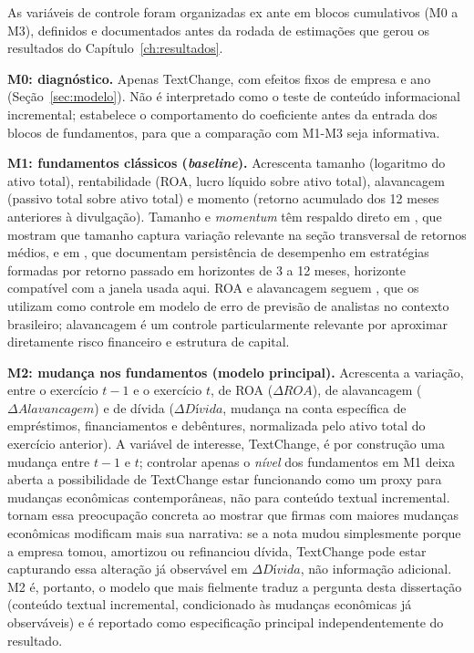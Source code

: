 \documentclass[a4paper,12pt]{report}
\begin{document}
As variáveis de controle foram organizadas ex ante em blocos cumulativos (M0 a M3), definidos e documentados antes da rodada de estimações que gerou os resultados do Capítulo~\ref{ch:resultados}.

\textbf{M0: diagnóstico.} Apenas TextChange, com efeitos fixos de empresa e ano (Seção~\ref{sec:modelo}). Não é interpretado como o teste de conteúdo informacional incremental; estabelece o comportamento do coeficiente antes da entrada dos blocos de fundamentos, para que a comparação com M1-M3 seja informativa.

\textbf{M1: fundamentos clássicos (\textit{baseline}).} Acrescenta tamanho (logaritmo do ativo total), rentabilidade (ROA, lucro líquido sobre ativo total), alavancagem (passivo total sobre ativo total) e momento (retorno acumulado dos 12 meses anteriores à divulgação). Tamanho e \textit{momentum} têm respaldo direto em , que mostram que tamanho captura variação relevante na seção transversal de retornos médios, e em , que documentam persistência de desempenho em estratégias formadas por retorno passado em horizontes de 3 a 12 meses, horizonte compatível com a janela usada aqui. ROA e alavancagem seguem , que os utilizam como controle em modelo de erro de previsão de analistas no contexto brasileiro; alavancagem é um controle particularmente relevante por aproximar diretamente risco financeiro e estrutura de capital.

\textbf{M2: mudança nos fundamentos (\textbf{modelo principal}).} Acrescenta a variação, entre o exercício $t-1$ e o exercício $t$, de ROA ($\Delta\mathit{ROA}$), de alavancagem ($\Delta\mathit{Alavancagem}$) e de dívida ($\Delta\mathit{Dívida}$, mudança na conta específica de empréstimos, financiamentos e debêntures, normalizada pelo ativo total do exercício anterior). A variável de interesse, TextChange, é por construção uma mudança entre $t-1$ e $t$; controlar apenas o \emph{nível} dos fundamentos em M1 deixa aberta a possibilidade de TextChange estar funcionando como um proxy para mudanças econômicas contemporâneas, não para conteúdo textual incremental.  tornam essa preocupação concreta ao mostrar que firmas com maiores mudanças econômicas modificam mais sua narrativa: se a nota mudou simplesmente porque a empresa tomou, amortizou ou refinanciou dívida, TextChange pode estar capturando essa alteração já observável em $\Delta\mathit{Dívida}$, não informação adicional. M2 é, portanto, o modelo que mais fielmente traduz a pergunta desta dissertação (conteúdo textual incremental, condicionado às mudanças econômicas já observáveis) e é reportado como especificação principal independentemente do resultado.
\end{document}
